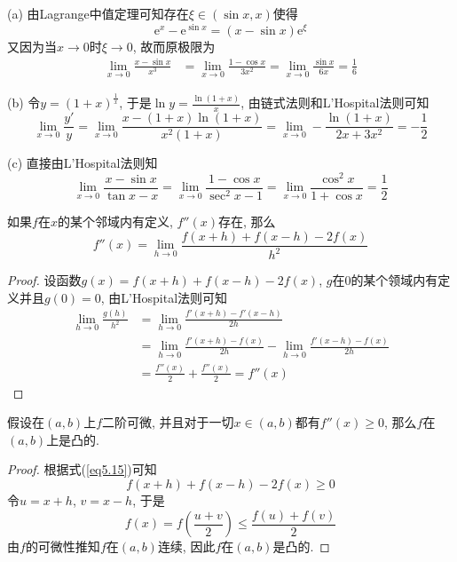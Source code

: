 \documentclass[cn,12pt,math=mtpro2,citestyle=gb7714-2015,bibstyle=gb7714-2015,twocol]{elegantbook}
\begin{document}
(a) 由Lagrange中值定理可知存在$\xi\in(\sin x,x)$使得
$$\text{e}^x-\text{e}^{\sin x}=(x-\sin x)\text{e}^{\xi}$$
又因为当$x\to0$时$\xi\to0$, 故而原极限为
\begin{align*}
\lim_{x\to0}\frac{x-\sin x}{x^3} &= \lim_{x\to0}\frac{1-\cos x}{3x^2} =\lim_{x\to0}\frac{\sin x}{6x}=\frac{1}{6}
\end{align*}

(b) 令$y=(1+x)^{\frac{1}{x}}$, 于是$\ln y=\displaystyle\frac{\ln(1+x)}{x}$, 由链式法则和L'Hospital法则可知
$$\lim_{x\to0}\frac{y'}{y}=\lim_{x\to0}\frac{x-(1+x)\ln(1+x)}{x^2(1+x)}=\lim_{x\to0}-\frac{\ln(1+x)}{2x+3x^2}=-\frac{1}{2}$$

(c) 直接由L'Hospital法则知
$$\displaystyle \lim_{x\to0}\frac{x-\sin x}{\tan x-x}=\lim_{x\to0}\frac{1-\cos x}{\sec^2x-1}=\lim_{x\to0}\frac{\cos^2x}{1+\cos x}=\frac{1}{2}$$

\begin{example}
如果$f$在$x$的某个邻域内有定义, $f''(x)$存在, 那么
\begin{equation}\label{eq5.15}
  f''(x)=\lim_{h\to0}\frac{f(x+h)+f(x-h)-2f(x)}{h^2}
\end{equation}
\end{example}
\begin{proof}
  设函数$g(x)=f(x+h)+f(x-h)-2f(x)$, $g$在$0$的某个领域内有定义并且$g(0)=0$, 由L'Hospital法则可知
  \begin{align*}
  \lim_{h\to0}\frac{g(h)}{h^2}&=\lim_{h\to0}\frac{f'(x+h)-f'(x-h)}{2h}\\
  &=\lim_{h\to0}\frac{f'(x+h)-f(x)}{2h}-\lim_{h\to0}\frac{f'(x-h)-f(x)}{2h}\\
  &=\frac{f''(x)}{2}+\frac{f''(x)}{2}=f''(x)
  \end{align*}
\end{proof}
\begin{example}
假设在$(a,b)$上$f$二阶可微, 并且对于一切$x\in(a,b)$都有$f''(x)\geq0$, 那么$f$在$(a,b)$上是凸的.
\end{example}
\begin{proof}
  根据式(\ref{eq5.15})可知
  $$f(x+h)+f(x-h)-2f(x)\geq0$$
  令$u=x+h$, $v=x-h$, 于是
  $$f(x)=f\left(\frac{u+v}{2}\right)\leq\frac{f(u)+f(v)}{2}$$
  由$f$的可微性推知$f$在$(a,b)$连续, 因此$f$在$(a,b)$是凸的.

\end{proof}
\end{document}
